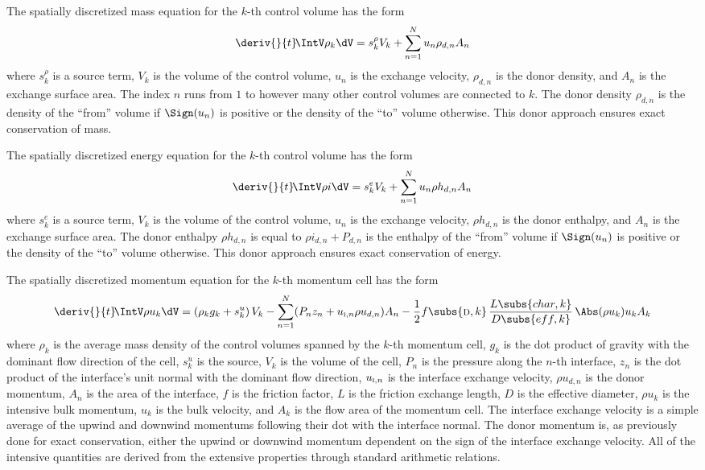 The spatially discretized mass equation for the $k$-th control volume has the form
\begin{equation}
    \deriv{}{t}\!\IntV \rho_k \dV = s^\rho_k V_k + \sum_{n=1}^{N} u_n \rho_{d,n} A_n  \label{Eqn:SemiMass}
\end{equation}
where $s^\rho_k$ is a source term, $V_k$ is the volume of the control volume, $u_n$ is the exchange velocity, $\rho_{d,n}$ is the donor density, and $A_n$ is the exchange surface area.  The index $n$ runs from $1$ to however many other control volumes are connected to $k$.
The donor density $\rho_{d,n}$ is the density of the ``from'' volume if $\Sign(u_n)$ is positive or the density of the ``to'' volume otherwise.
This donor approach ensures exact conservation of mass.

The spatially discretized energy equation for the $k$-th control volume has the form
\begin{equation}
    \deriv{}{t}\! \IntV \rho i \dV = s^e_k V_k + \sum_{n=1}^{N} u_n \rho{h}_{d,n} A_n \label{Eqn:SemiEnergy}
\end{equation}
where $s^e_k$ is a source term, $V_k$ is the volume of the control volume, $u_n$ is the exchange velocity, $\rho{h}_{d,n}$ is the donor enthalpy, and $A_n$ is the exchange surface area.  The donor enthalpy $\rho{h}_{d,n}$ is equal to $\rho{i}_{d,n} + P_{d,n}$ is the enthalpy of the ``from'' volume if $\Sign(u_n)$ is positive or the density of the ``to'' volume otherwise.
This donor approach ensures exact conservation of energy.



The spatially discretized momentum equation for the $k$-th momentum cell has the form
\begin{equation}
    \deriv{}{t}\! \IntV \rho u_k \dV = 
    (\rho_k g_k + s^u_k)\,V_k 
    - \sum_{n=1}^{N}   (P_n z_n +  u_{\text{\textsc{i}},n} \rho{u}_{d,n}) A_n 
    - \frac{1}{2} f\subs{\textsc{d},k}\,\frac{L\subs{char,k}}{D\subs{eff,k}}\,\Abs(\rho{u}_k) u_k A_k  \label{Eqn:SemiMomentum}
\end{equation}
where $\rho_k$ is the average mass density of the control volumes spanned by the $k$-th momentum cell, $g_k$ is the dot product of gravity with the dominant flow direction of the cell, $s^u_k$ is the source, $V_k$ is the volume of the cell, $P_n$ is the pressure along the $n$-th interface, $z_n$ is the dot product of the interface's unit normal with the dominant flow direction, $u_{\text{\textsc{i}},n}$ is the interface exchange velocity,
$\rho{u}_{d,n}$ is the donor momentum, $A_n$ is the area of the interface, 
$f$ is the friction factor, $L$ is the friction exchange length, $D$ is the effective diameter, 
$\rho{u}_k$ is the intensive bulk momentum, $u_k$ is the bulk velocity, and $A_k$ is the flow area of the momentum cell.
The interface exchange velocity is a simple average of the upwind and downwind momentums following their dot with the interface normal.
The donor momentum is, as previously done for exact conservation, either the upwind or downwind momentum dependent on the sign of the interface exchange velocity.
All of the intensive quantities are derived from the extensive properties through standard arithmetic relations.


